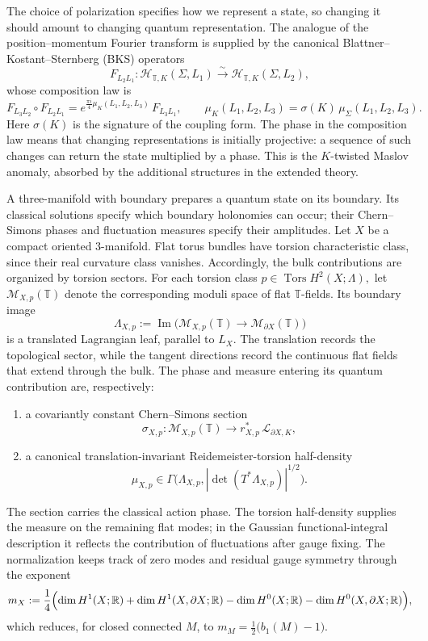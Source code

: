 \documentclass[12pt]{amsart}
\numberwithin{equation}{section}
\theoremstyle{definition}
\begin{document}
The choice of polarization specifies how we represent a state, so changing it should amount to changing quantum representation. The analogue of the position--momentum Fourier transform is supplied by the canonical
Blattner--Kostant--Sternberg (BKS) operators
$$
F_{L_2L_1}:\mathcal H_{\mathbb T,K}(\Sigma,L_1)\xrightarrow{\sim}\mathcal H_{\mathbb T,K}(\Sigma,L_2),
$$
whose composition law is
$$
F_{L_3L_2}\circ F_{L_2L_1}
=
e^{\frac{\pi i}{4}\mu_K(L_1,L_2,L_3)}\,F_{L_3L_1},
\qquad
\mu_K(L_1,L_2,L_3)=\sigma(K)\,\mu_\Sigma(L_1,L_2,L_3).
$$
Here $\sigma(K)$ is the signature of the coupling form. The phase in the composition law means that changing representations is initially projective: a sequence of such changes can return the state multiplied by a phase. This is the $K$-twisted Maslov anomaly, absorbed by the additional structures in the extended theory.

A three-manifold with boundary prepares a quantum state on its boundary. Its classical solutions specify which boundary holonomies can occur; their Chern--Simons phases and fluctuation measures specify their amplitudes. Let $X$ be a compact oriented $3$-manifold. Flat torus bundles have torsion characteristic class, since their real curvature class vanishes. Accordingly, the bulk contributions are organized by torsion sectors.
For each torsion class $p\in \operatorname{Tors}H^2(X;\Lambda),$ let $\mathcal M_{X,p}(\mathbb T)$ denote the corresponding moduli space of flat $\mathbb T$-fields.
Its boundary image
$$
\Lambda_{X,p}:=\operatorname{Im}\!\bigl(\mathcal M_{X,p}(\mathbb T)\to \mathcal M_{\partial X}(\mathbb T)\bigr)
$$
is a translated Lagrangian leaf, parallel to $L_X$. The translation records the topological sector, while the tangent directions record the continuous flat fields that extend through the bulk. The phase and measure entering its quantum contribution are, respectively:

\begin{enumerate}[label=\rm(\arabic*)]
\item a covariantly constant Chern--Simons section
$$
\sigma_{X,p}:\mathcal M_{X,p}(\mathbb T)\longrightarrow r_{X,p}^*\,\mathcal L_{\partial X,K},
$$
\item a canonical translation-invariant Reidemeister-torsion half-density
$$
\mu_{X,p}\in
\Gamma\!\bigl(\Lambda_{X,p},|\det(T^*\Lambda_{X,p})|^{1/2}\bigr).
$$
\end{enumerate}

The section carries the classical action phase. The torsion half-density supplies the measure on the remaining flat modes; in the Gaussian functional-integral description it reflects the contribution of fluctuations after gauge fixing. The normalization keeps track of zero modes and residual gauge symmetry through the exponent
$$
m_X:=
\frac14\Bigl(
\dim H^1(X;\mathbb R)+\dim H^1(X,\partial X;\mathbb R)
-\dim H^0(X;\mathbb R)-\dim H^0(X,\partial X;\mathbb R)
\Bigr),
$$
which reduces, for closed connected $M$, to $m_M=\frac12\bigl(b_1(M)-1\bigr)$.
\end{document}
